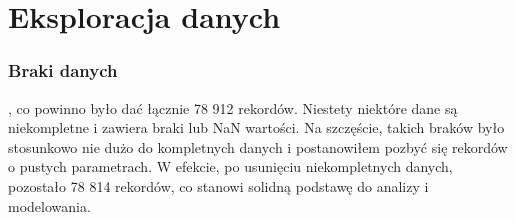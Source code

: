 \chapter{Eksploracja danych}
\label{ch:eksploracja}

\subsection{Braki danych}
, co powinno było dać łącznie 78 912 rekordów. Niestety niektóre dane są niekompletne i zawiera braki lub NaN wartości. Na szczęście, takich braków było stosunkowo nie dużo do kompletnych danych i postanowiłem pozbyć się rekordów o pustych parametrach. W efekcie, po usunięciu niekompletnych danych, pozostało 78 814 rekordów, co stanowi solidną podstawę do analizy i modelowania.
